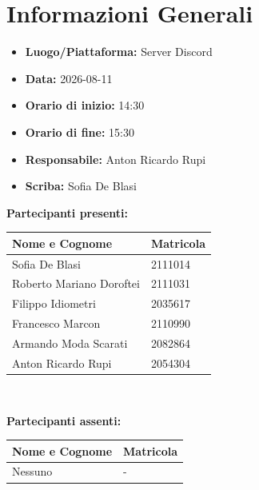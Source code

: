 \section{Informazioni Generali}
\begin{itemize}
	\item \textbf{Luogo/Piattaforma:} Server Discord
	\item \textbf{Data:} 2026-08-11
	\item \textbf{Orario di inizio:} 14:30
	\item \textbf{Orario di fine:} 15:30
	\item \textbf{Responsabile:} Anton Ricardo Rupi
	\item \textbf{Scriba:} Sofia De Blasi
\end{itemize}

\vspace{0.5cm}
\textbf{Partecipanti presenti:}
\begin{table}[ht]
	\centering
	\renewcommand{\arraystretch}{1.2}
	\begin{tabularx}{\textwidth}{X l}
		\toprule
		\textbf{Nome e Cognome} & \textbf{Matricola} \\
		\midrule
		Sofia De Blasi & 2111014 \\
		Roberto Mariano Doroftei & 2111031 \\
		Filippo Idiometri & 2035617 \\
		Francesco Marcon & 2110990 \\
		Armando Moda Scarati & 2082864 \\
		Anton Ricardo Rupi & 2054304 \\
		\bottomrule
	\end{tabularx}
\\ \end{table}

\vspace{0.5cm}
\textbf{Partecipanti assenti:}
\begin{table}[ht]
	\centering
	\renewcommand{\arraystretch}{1.2}
	\begin{tabularx}{\textwidth}{X l}
		\toprule
		\textbf{Nome e Cognome} & \textbf{Matricola} \\
		\midrule
		Nessuno & - \\
		\bottomrule
	\end{tabularx}
\end{table}

